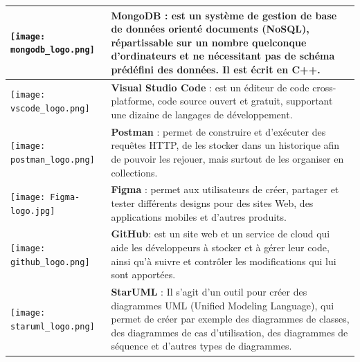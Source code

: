 \begin{longtable}[c]{
    |p{}
    |p{}|
    }
    \hline
    \vspace{0.5 mm}
    \texttt{[image: mongodb\_logo.png]}   & \textbf{MongoDB }: est un système de gestion de base de données orienté documents (NoSQL), répartissable sur un nombre quelconque d'ordinateurs et ne nécessitant pas de schéma prédéfini des données. Il est écrit en C++.   \cite[]{Mongodb}                                                                                           \\
    \hline
    \vspace{0.5 mm}
    \texttt{[image: vscode\_logo.png]}    & \textbf{ Visual Studio Code }: est un éditeur de code cross-platforme, code source ouvert et gratuit, supportant une dizaine de langages de développement.  \cite[]{vscode}                                                                                                                                                              \\
    \hline
    \vspace{0.5 mm}
    \texttt{[image: postman\_logo.png]}   & \textbf{ Postman }: permet de construire et d’exécuter des requêtes HTTP, de les stocker dans un historique afin de pouvoir les rejouer, mais surtout de les organiser en collections.     \cite[]{postman}                                                                                                                             \\
    \hline
    \vspace{0.5 mm}
    \texttt{[image: Figma-logo.jpg]}   & \textbf{Figma} :   permet aux utilisateurs de créer, partager et tester différents designs pour des sites Web, des applications mobiles et d'autres produits. \cite[]{Figma}      \\
    \hline
    \vspace{0.5 mm}
    \texttt{[image: github\_logo.png]}    & \textbf{ GitHub}: est un site web et un service de cloud qui aide les développeurs à stocker et à gérer leur code, ainsi qu’à suivre et contrôler les modifications qui lui sont apportées. \cite[]{gitHub}                                                                                                                               \\
    \hline
    \vspace{0.5 mm}
    \texttt{[image: staruml\_logo.png]}   & \textbf{StarUML} : Il s'agit d'un outil pour créer des diagrammes UML (Unified Modeling Language), qui permet de créer par exemple des diagrammes de classes, des diagrammes de cas d'utilisation, des diagrammes de séquence et d'autres types de diagrammes.                                                           \\
    \hline

\end{longtable}


